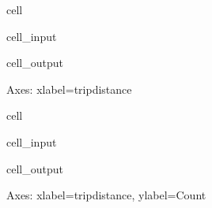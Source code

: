 \documentclass[letterpaper,10pt,english]{sphinxmanual}
\begin{document}
\begin{sphinxuseclass}{cell}
\begin{sphinxuseclass}{cell_input}
\begin{sphinxVerbatim}[commandchars=\\\{\}]
\PYG{p}{[}\PYG{p}{]}
\end{sphinxVerbatim}

\end{sphinxuseclass}
\begin{sphinxuseclass}{cell_output}
\begin{sphinxVerbatim}[commandchars=\\\{\}]
\PYGZlt{}Axes: xlabel=\PYGZsq{}trip\PYGZus{}distance\PYGZsq{}\PYGZgt{}
\end{sphinxVerbatim}

\noindent{}

\end{sphinxuseclass}
\end{sphinxuseclass}
\begin{sphinxuseclass}{cell}
\begin{sphinxuseclass}{cell_input}
\begin{sphinxVerbatim}[commandchars=\\\{\}]
\PYG{p}{[}\PYG{p}{]} 
\end{sphinxVerbatim}

\end{sphinxuseclass}
\begin{sphinxuseclass}{cell_output}
\begin{sphinxVerbatim}[commandchars=\\\{\}]
\PYGZlt{}Axes: xlabel=\PYGZsq{}trip\PYGZus{}distance\PYGZsq{}, ylabel=\PYGZsq{}Count\PYGZsq{}\PYGZgt{}
\end{sphinxVerbatim}

\noindent{}

\end{sphinxuseclass}
\end{sphinxuseclass}
\sphinxAtStartPar
{}
\end{document}
